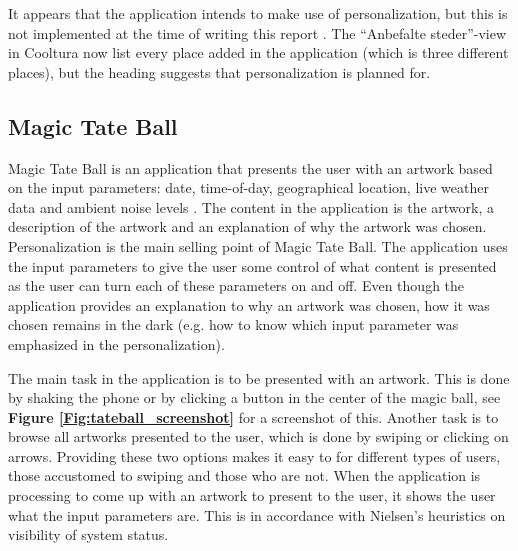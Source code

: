 It appears that the application intends to make use of personalization, but this is not implemented at the time of writing this report \cite{AS4}. The “Anbefalte steder”-view in Cooltura now list every place added in the application (which is three different places), but the heading suggests that personalization is planned for. 

\subsection{Magic Tate Ball}

Magic Tate Ball is an application that presents the user with an artwork based on the input parameters: date, time-of-day, geographical location, live weather data and ambient noise levels \cite{AS5}. The content in the application is the artwork, a description of the artwork and an explanation of why the artwork was chosen. Personalization is the main selling point of Magic Tate Ball. The application uses the input parameters to give the user some control of what content is presented as the user can turn each of these parameters on and off. Even though the application provides an explanation to why an artwork was chosen, how it was chosen remains in the dark (e.g. how to know which input parameter was emphasized in the personalization).\newline


The main task in the application is to be presented with an artwork. This is done by shaking the phone or by clicking a button in the center of the magic ball, see \textbf{Figure \ref{Fig:tateball_screenshot}} for a screenshot of this. Another task is to browse all artworks presented to the user, which is done by swiping or clicking on arrows. Providing these two options makes it easy to for different types of users, those accustomed to swiping and those who are not. When the application is processing to come up with an artwork to present to the user, it shows the user what the input parameters are. This is in accordance with Nielsen’s heuristics on visibility of system status. \newline

\cleardoublepage